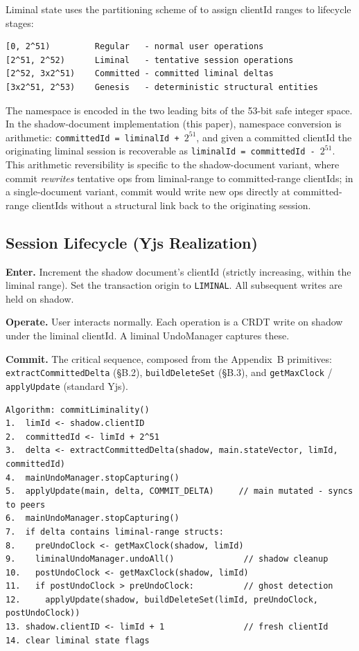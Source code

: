 Liminal state uses the partitioning scheme of \cite{plexus:partitioning} to assign clientId ranges to lifecycle stages:

\begin{lstlisting}
[0, 2^51)         Regular   - normal user operations
[2^51, 2^52)      Liminal   - tentative session operations
[2^52, 3x2^51)    Committed - committed liminal deltas
[3x2^51, 2^53)    Genesis   - deterministic structural entities
\end{lstlisting}

The namespace is encoded in the two leading bits of the 53-bit safe integer space. In the shadow-document implementation (this paper), namespace conversion is arithmetic: \texttt{committedId = liminalId + $2^{51}$}, and given a committed clientId the originating liminal session is recoverable as \texttt{liminalId = committedId - $2^{51}$}. This arithmetic reversibility is specific to the shadow-document variant, where commit \emph{rewrites} tentative ops from liminal-range to committed-range clientIds; in a single-document variant, commit would write new ops directly at committed-range clientIds without a structural link back to the originating session.

\subsection{Session Lifecycle (Yjs Realization)}

\textbf{Enter.} Increment the shadow document's clientId (strictly increasing, within the liminal range). Set the transaction origin to \texttt{LIMINAL}. All subsequent writes are held on shadow.

\textbf{Operate.} User interacts normally. Each operation is a CRDT write on shadow under the liminal clientId. A liminal UndoManager captures these.

\textbf{Commit.} The critical sequence, composed from the Appendix~B primitives: \texttt{extractCommittedDelta} (\S B.2), \texttt{buildDeleteSet} (\S B.3), and \texttt{getMaxClock} / \texttt{applyUpdate} (standard Yjs).

\begin{lstlisting}
Algorithm: commitLiminality()
1.  limId <- shadow.clientID
2.  committedId <- limId + 2^51
3.  delta <- extractCommittedDelta(shadow, main.stateVector, limId, committedId)
4.  mainUndoManager.stopCapturing()
5.  applyUpdate(main, delta, COMMIT_DELTA)     // main mutated - syncs to peers
6.  mainUndoManager.stopCapturing()
7.  if delta contains liminal-range structs:
8.    preUndoClock <- getMaxClock(shadow, limId)
9.    liminalUndoManager.undoAll()              // shadow cleanup
10.   postUndoClock <- getMaxClock(shadow, limId)
11.   if postUndoClock > preUndoClock:          // ghost detection
12.     applyUpdate(shadow, buildDeleteSet(limId, preUndoClock, postUndoClock))
13. shadow.clientID <- limId + 1                // fresh clientId
14. clear liminal state flags
\end{lstlisting}

